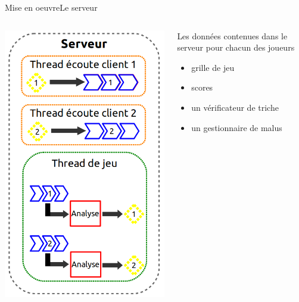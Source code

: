 \documentclass[french]{beamer}
\begin{document}
	\begin{frame}{Mise en oeuvre}{Le serveur}
		\begin{columns}

			\begin{column}{0.4\textwidth}
				\begin{center}
					\includegraphics[scale=0.25]{img/serveur.png}
				\end{center}
			\end{column}


			\begin{column}{0.5\textwidth}

				\begin{block}{Les données contenues dans le serveur pour chacun des joueurs}
					\begin{itemize}
						\item grille de jeu
						\item scores
						\item un vérificateur de triche
						\item un gestionnaire de malus
					\end{itemize}

				\end{block}
			\end{column}

		\end{columns}
	\end{frame}
\end{document}
